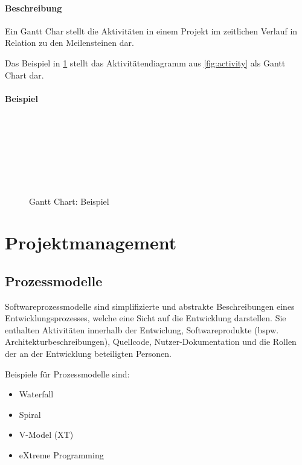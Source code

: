 \documentclass[a4paper, 11pt, accentcolor = tud3b]{tudreport}
\begin{document}
				\paragraph{Beschreibung}
					Ein Gantt Char stellt die Aktivitäten in einem Projekt im zeitlichen Verlauf in Relation zu den Meilensteinen dar.
					
					Das Beispiel in \ref{fig:gantt} stellt das Aktivitätendiagramm aus \ref{fig:activity} als Gantt Chart dar.
				
				\paragraph{Beispiel}
					\begin{figure}[ht]
						\centering
						\begin{ganttchart}[vgrid]{1}{21}
							\\
							 \\
							 \\
							 \\
							 \\
							 \\
						\end{ganttchart}
						\caption{Gantt Chart: Beispiel}
						\label{fig:gantt}
					\end{figure}
	
		\section{Projektmanagement}
			\subsection{Prozessmodelle}
				Softwareprozessmodelle sind simplifizierte und abstrakte Beschreibungen eines Entwicklungsprozesses, welche eine Sicht auf die Entwicklung darstellen. Sie enthalten Aktivitäten innerhalb der Entwiclung, Softwareprodukte (bspw. Architekturbeschreibungen), Quellcode, Nutzer-Dokumentation und die Rollen der an der Entwicklung beteiligten Personen.
				
				Beispiele für Prozessmodelle sind:
				\begin{itemize}
					\item Waterfall
					\item Spiral
					\item V-Model (XT)
					\item eXtreme Programming
				\end{itemize}
			
\end{document}
